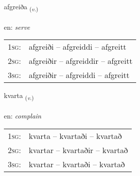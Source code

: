 \documentclass[frontgrid, backgrid]{flacards}\usepackage[]{graphicx}\usepackage[]{color}
\begin{document}
\renewcommand{\flhead}{\vskip5pt \fboxsep=0pt {\small\bfseries\footnotesize Sagnorð | Verb}}
\renewcommand{\fcfoot}{\vskip5pt \fboxsep=0pt \hspace{2pt}{\small\bfseries\footnotesize 2K}}

\renewcommand{\blhead}{\vskip5pt {\small\bfseries\footnotesize Sagnorð | Verb }}
\renewcommand{\bcfoot}{\vskip5pt \hspace{2pt}{\small\bfseries\footnotesize 2K}}


{afgreiða \small{\textsubscript{(\textit{v.})}} \\[1ex] %
\textphonetic{[avkreiða]} \\
en: \emph{serve} \\  [2ex]
\renewcommand*{\arraystretch}{0.8}
\begin{tabular}{p{1cm}l}
\textsc{1sg}: & afgreiði -- afgreiddi -- afgreitt \\ 
\textsc{2sg}: & afgreiðir -- afgreiddir -- afgreitt \\ 
\textsc{3sg}: & afgreiðir -- afgreiddi -- afgreitt \\ 
\end{tabular}
}

\renewcommand{\flhead}{\vskip5pt \fboxsep=0pt {\small\bfseries\footnotesize Sagnorð | Verb}}
\renewcommand{\fcfoot}{\vskip5pt \fboxsep=0pt \hspace{2pt}{\small\bfseries\footnotesize 2K}}

\renewcommand{\blhead}{\vskip5pt {\small\bfseries\footnotesize Sagnorð | Verb }}
\renewcommand{\bcfoot}{\vskip5pt \hspace{2pt}{\small\bfseries\footnotesize 2K}}


{kvarta \small{\textsubscript{(\textit{v.})}} \\[1ex] %
\textphonetic{[kʰvar̥ta]} \\
en: \emph{complain} \\  [2ex]
\renewcommand*{\arraystretch}{0.8}
\begin{tabular}{p{1cm}l}
\textsc{1sg}: & kvarta -- kvartaði -- kvartað \\ 
\textsc{2sg}: & kvartar -- kvartaðir -- kvartað \\ 
\textsc{3sg}: & kvartar -- kvartaði -- kvartað \\ 
\end{tabular}
}
\end{document}
